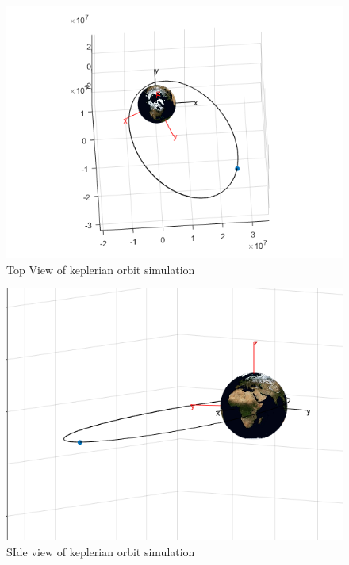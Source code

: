\documentclass[Space3_Assign1.tex]{subfiles}
\begin{document}
\begin{figure}[h!]
\centering
\caption{Top View of keplerian orbit simulation}
\label{fig:Q2_sim_top}
\includegraphics[width=0.7\linewidth]{Q2_sim_top}
\end{figure}
\begin{figure}[h!]
\centering
\caption{SIde view of keplerian orbit simulation}
\label{fig:Q2_sim_side}
\includegraphics[width=0.7\linewidth]{Q2_sim_side}
\end{figure}

\end{document}
